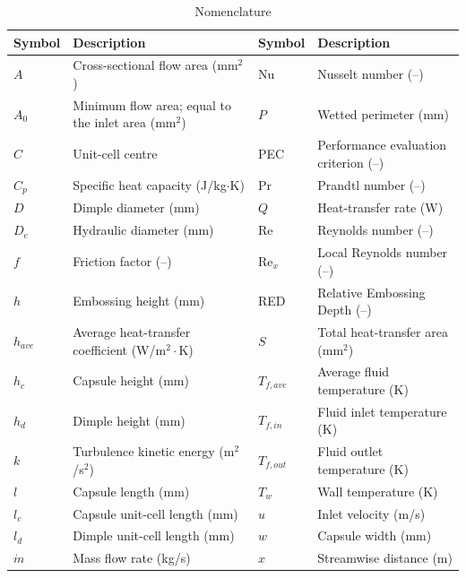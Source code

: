 \documentclass[energies,article,submit,moreauthors,noheaderline]{Definitions/mdpi}
\def\quad{ }%
\begin{document}
\fancyheadoffset[L]{0pt}
\fancyfootoffset[L]{0pt}

\begin{table}[H]
\caption{Nomenclature}
\centering
\scriptsize
\renewcommand{\arraystretch}{1.05}
\begin{tabularx}{\textwidth}{@{}l>{\raggedright\arraybackslash}X@{\quad}l>{\raggedright\arraybackslash}X@{}}
\hline
\textbf{Symbol} & \textbf{Description} & \textbf{Symbol} & \textbf{Description} \\
\hline
$A$         & Cross-sectional flow area (mm$^2$) & Nu          & Nusselt number (--) \\
$A_0$       & Minimum flow area; equal to the inlet area (mm$^2$) & $P$ & Wetted perimeter (mm) \\
$C$         & Unit-cell centre & PEC & Performance evaluation criterion (--) \\
$C_p$       & Specific heat capacity (J/kg$\cdot$K) & Pr          & Prandtl number (--) \\
$D$         & Dimple diameter (mm) & $Q$ & Heat-transfer rate (W) \\
$D_e$       & Hydraulic diameter (mm) & Re          & Reynolds number (--) \\
$f$         & Friction factor (--) & $\mathrm{Re}_x$ & Local Reynolds number (--) \\
$h$         & Embossing height (mm) & RED         & Relative Embossing Depth (--) \\
$h_{ave}$   & Average heat-transfer coefficient (W/m$^2\cdot$K) & $S$         & Total heat-transfer area (mm$^2$) \\
$h_c$       & Capsule height (mm) & $T_{f,ave}$ & Average fluid temperature (K) \\
$h_d$       & Dimple height (mm) & $T_{f,in}$ & Fluid inlet temperature (K) \\
$k$         & Turbulence kinetic energy (m$^2$/s$^2$) & $T_{f,out}$ & Fluid outlet temperature (K) \\
$l$         & Capsule length (mm)  & $T_w$       & Wall temperature (K) \\
$l_c$       & Capsule unit-cell length (mm) & $u$         & Inlet velocity (m/s) \\
$l_d$       & Dimple unit-cell length (mm) & $w$         & Capsule width (mm) \\
$\dot{m}$         & Mass flow rate (kg/s) & $x$         & Streamwise distance (m) \\

\end{tabularx}
\end{table}
\end{document}
